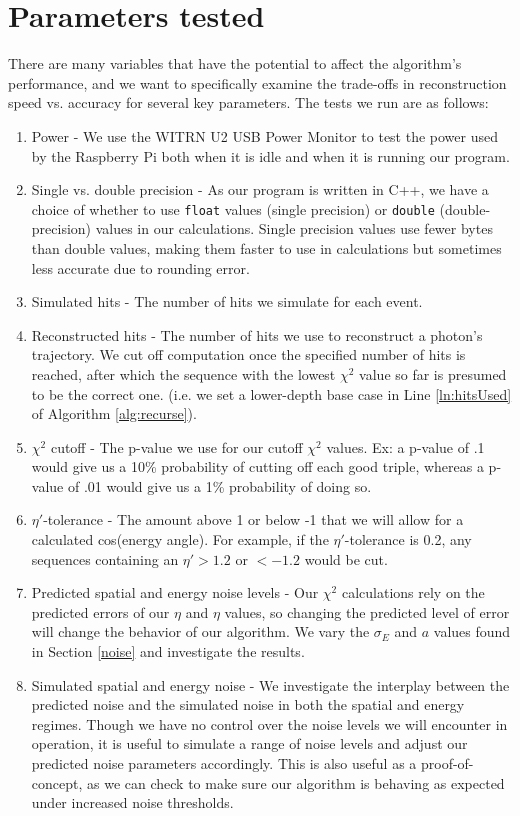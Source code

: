 \section{Parameters tested} \label{vars}
There are many variables that have the potential to affect the algorithm's performance, and we want to specifically examine the trade-offs in reconstruction speed vs. accuracy for several key parameters. The tests we run are as follows:

\begin{enumerate}
    \item Power - We use the WITRN U2 USB Power Monitor to test the power used by the Raspberry Pi both when it is idle and when it is running our program.
    \item Single vs. double precision - As our program is written in C++, we have a choice of whether to use \texttt{float} values (single precision) or \texttt{double} (double-precision) values in our calculations. Single precision values use fewer bytes than double values, making them faster to use in calculations but sometimes less accurate due to rounding error.
    \item Simulated hits - The number of hits we simulate for each event.
    \item Reconstructed hits - The number of hits we use to reconstruct a photon's trajectory. We cut off computation once the specified number of hits is reached, after which the sequence with the lowest $\chi^2$ value so far is presumed to be the correct one. (i.e. we set a lower-depth base case in Line \ref{ln:hitsUsed} of Algorithm \ref{alg:recurse}).
    \item $\chi^2$ cutoff - The p-value we use for our cutoff $\chi^2$ values. Ex: a p-value of .1 would give us a 10\% probability of cutting off each good triple, whereas a p-value of .01 would give us a 1\% probability of doing so.
    \item $\eta'$-tolerance - The amount above 1 or below -1 that we will allow for a calculated cos(energy angle). For example, if the $\eta'$-tolerance is 0.2, any sequences containing an $\eta' > 1.2$ or $< -1.2$ would be cut.
    \item Predicted spatial and energy noise levels - Our $\chi^2$ calculations rely on the predicted errors of our $\eta$ and $\eta$ values, so changing the predicted level of error will change the behavior of our algorithm. We vary the $\sigma_E$ and $a$ values found in Section \ref{noise} and investigate the results.
    \item Simulated spatial and energy noise - We investigate the interplay between the predicted noise and the simulated noise in both the spatial and energy regimes. Though we have no control over the noise levels we will encounter in operation, it is useful to simulate a range of noise levels and adjust our predicted noise parameters accordingly. This is also useful as a proof-of-concept, as we can check to make sure our algorithm is behaving as expected under increased noise thresholds.
\end{enumerate}